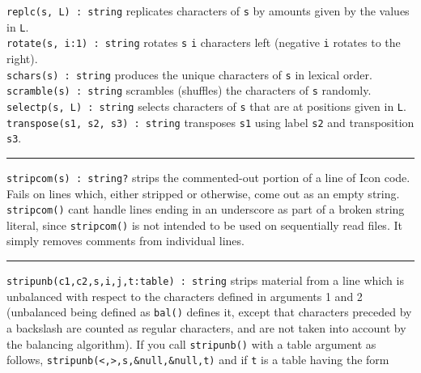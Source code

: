 \texttt{replc(s, L) : string} replicates characters of \texttt{s} by
amounts given by the values in \texttt{L}.\\
\texttt{rotate(s, i:1) : string} rotates \texttt{s} \texttt{i}
characters left (negative \texttt{i} rotates to the
right).\\
\texttt{schars(s) : string} produces the unique characters of \texttt{s}
in lexical order.\\
\texttt{scramble(s) : string} scrambles (shuffles) the characters of
\texttt{s} randomly.\\
\texttt{selectp(s, L) : string} selects characters of \texttt{s} that
are at positions given in \texttt{L}.\\
\texttt{transpose(s1, s2, s3) : string} transposes \texttt{s1} using
label \texttt{s2} and transposition \texttt{s3}.

\vspace{0.25cm}\hrule{}

\texttt{stripcom(s) : string?} strips the commented-out portion of a
line of Icon code. Fails on lines which, either stripped or otherwise,
come out as an empty string. \texttt{stripcom()} can{\textquotesingle}t
handle lines ending in an underscore as part of a broken string
literal, since \texttt{stripcom()} is not intended to be used on
sequentially read files. It simply removes comments from
individual lines.

\vspace{0.25cm}\hrule{}

\texttt{stripunb(c1,c2,s,i,j,t:table) : string} strips material from a
line which is unbalanced with respect to the characters defined in
arguments 1 and 2 (unbalanced being defined as \texttt{bal()} defines
it, except that characters preceded by a backslash are counted as
regular characters, and are not taken into account by the balancing
algorithm). If you call \texttt{stripunb()} with a table argument as
follows,
\texttt{stripunb({\textquotesingle}{\textless}{\textquotesingle},{\textquotesingle}{\textgreater}{\textquotesingle},s,\&null,\&null,t)}
and if \texttt{t} is a table having the form

\iconcode{
key: {\textquotedbl}bold{\textquotedbl} value:
outstr({\textquotedbl}{\textbackslash}e[2m{\textquotedbl},
{\textquotedbl}{\textbackslash}e1m{\textquotedbl}) \\
key: {\textquotedbl}underline{\textquotedbl} value:
outstr({\textquotedbl}{\textbackslash}e[4m{\textquotedbl},
{\textquotedbl}{\textbackslash}e1m{\textquotedbl}) etc.}

